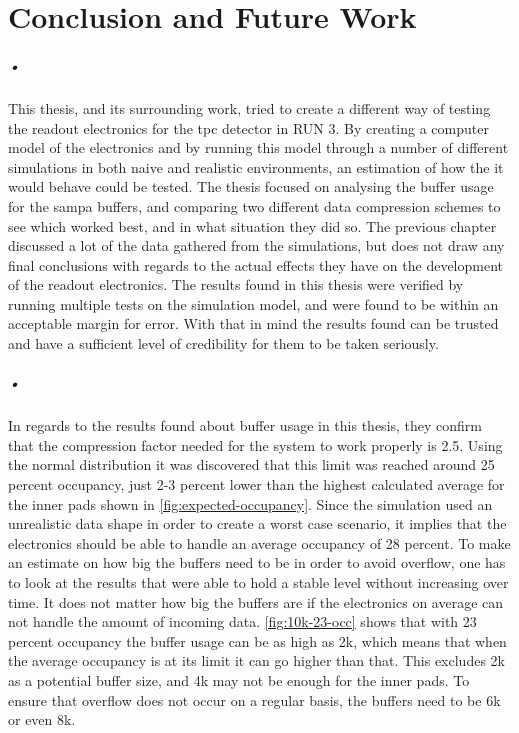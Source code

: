 \documentclass[a4paper, 12pt]{report}
\begin{document}
\chapter{Conclusion and Future Work}

\paragraph{•}
This thesis, and its surrounding work, tried to create a different way of testing the readout electronics for the \gls{tpc} detector in RUN 3.
By creating a computer model of the electronics and by running this model through a number of different simulations in both naive and realistic environments, an estimation of how the it would behave could be tested.
The thesis focused on analysing the buffer usage for the \gls{sampa} buffers, and comparing two different data compression schemes to see which worked best, and in what situation they did so.
The previous chapter discussed a lot of the data gathered from the simulations, but does not draw any final conclusions with regards to the actual effects they have on the development of the readout electronics.
The results found in this thesis were verified by running multiple tests on the simulation model, and were found to be within an acceptable margin for error.
With that in mind the results found can be trusted and have a sufficient level of credibility for them to be taken seriously.

\paragraph{•}
In regards to the results found about buffer usage in this thesis, they confirm that the compression factor needed for the system to work properly is 2.5.
Using the normal distribution it was discovered that this limit was reached around 25 percent occupancy, just 2-3 percent lower than the highest calculated average for the inner pads shown in \ref{fig:expected-occupancy}.
Since the simulation used an unrealistic data shape in order to create a worst case scenario, it implies that the electronics should be able to handle an average occupancy of 28 percent.
To make an estimate on how big the buffers need to be in order to avoid overflow, one has to look at the results that were able to hold a stable level without increasing over time.
It does not matter how big the buffers are if the electronics on average can not handle the amount of incoming data.
\ref{fig:10k-23-occ} shows that with 23 percent occupancy the buffer usage can be as high as 2k, which means that when the average occupancy is at its limit it can go higher than that.
This excludes 2k as a potential buffer size, and 4k may not be enough for the inner pads.
To ensure that overflow does not occur on a regular basis, the buffers need to be 6k or even 8k.
\end{document}
